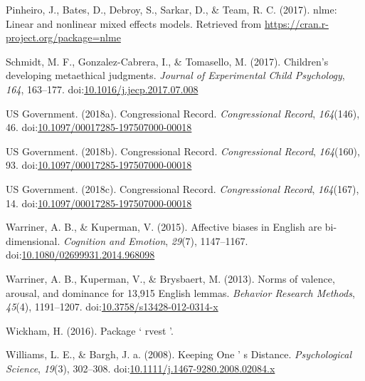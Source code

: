 \documentclass[,man]{apa6}
\begin{document}
\hypertarget{ref-Pinheiro2017}{}
Pinheiro, J., Bates, D., Debroy, S., Sarkar, D., \& Team, R. C. (2017).
nlme: Linear and nonlinear mixed effects models. Retrieved from
\url{https://cran.r-project.org/package=nlme}

\hypertarget{ref-Schmidt2017}{}
Schmidt, M. F., Gonzalez-Cabrera, I., \& Tomasello, M. (2017).
Children's developing metaethical judgments. \emph{Journal of
Experimental Child Psychology}, \emph{164}, 163--177.
doi:\href{https://doi.org/10.1016/j.jecp.2017.07.008}{10.1016/j.jecp.2017.07.008}

\hypertarget{ref-USGovernment2018b}{}
US Government. (2018a). Congressional Record. \emph{Congressional
Record}, \emph{164}(146), 46.
doi:\href{https://doi.org/10.1097/00017285-197507000-00018}{10.1097/00017285-197507000-00018}

\hypertarget{ref-USGovernment2018}{}
US Government. (2018b). Congressional Record. \emph{Congressional
Record}, \emph{164}(160), 93.
doi:\href{https://doi.org/10.1097/00017285-197507000-00018}{10.1097/00017285-197507000-00018}

\hypertarget{ref-USGovernment2018a}{}
US Government. (2018c). Congressional Record. \emph{Congressional
Record}, \emph{164}(167), 14.
doi:\href{https://doi.org/10.1097/00017285-197507000-00018}{10.1097/00017285-197507000-00018}

\hypertarget{ref-Warriner2015}{}
Warriner, A. B., \& Kuperman, V. (2015). Affective biases in English are
bi-dimensional. \emph{Cognition and Emotion}, \emph{29}(7), 1147--1167.
doi:\href{https://doi.org/10.1080/02699931.2014.968098}{10.1080/02699931.2014.968098}

\hypertarget{ref-Warriner2013}{}
Warriner, A. B., Kuperman, V., \& Brysbaert, M. (2013). Norms of
valence, arousal, and dominance for 13,915 English lemmas.
\emph{Behavior Research Methods}, \emph{45}(4), 1191--1207.
doi:\href{https://doi.org/10.3758/s13428-012-0314-x}{10.3758/s13428-012-0314-x}

\hypertarget{ref-Wickham2016}{}
Wickham, H. (2016). Package ` rvest '.

\hypertarget{ref-Williams2008}{}
Williams, L. E., \& Bargh, J. a. (2008). Keeping One ' s Distance.
\emph{Psychological Science}, \emph{19}(3), 302--308.
doi:\href{https://doi.org/10.1111/j.1467-9280.2008.02084.x}{10.1111/j.1467-9280.2008.02084.x}

\endgroup
\end{document}
